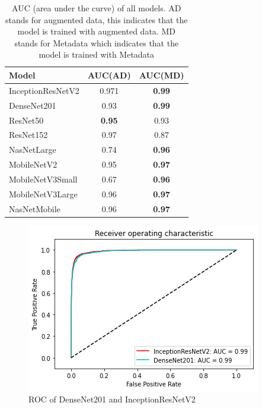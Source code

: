 \documentclass[sensors,article,submit,pdftex,moreauthors]{Definitions/mdpi}
\begin{document}
	\begin{table}[H]
		\centering
		\begin{tabular}{| l | c  c | }
			\hline
			Model & AUC(AD) & AUC(MD)\\ 
			\hline
			InceptionResNetV2 & 0.971 & \textbf{0.99}\\
			\hline
			DenseNet201 & 0.93 & \textbf{0.99}\\
			\hline
			ResNet50 & \textbf{0.95} & 0.93 \\
			\hline
			ResNet152 & 0.97 & 0.87\\
			\hline
			NasNetLarge & 0.74 & \textbf{0.96}\\
			\hline
			MobileNetV2 & 0.95 & \textbf{0.97}\\
			\hline
			MobileNetV3Small & 0.67 & \textbf{0.96}\\
			\hline
			MobileNetV3Large & 0.96 & \textbf{0.97}\\
			\hline
			NasNetMobile & 0.96 & \textbf{0.97}\\
			\hline
		\end{tabular}
		\caption{AUC (area under the curve) of all models. AD stands for augmented data, this indicates that the model is trained with augmented data. MD stands for Metadata which indicates that the model is trained with Metadata}
		\label{table:overall-auc}
	\end{table}
	
	\begin{figure}[!htb]
		\centering
		\includegraphics[width=1\linewidth]{Definitions/ROC/denvsirv2}
		\caption{ROC of DenseNet201 and InceptionResNetV2}\label{fig:densevsirv2}
	\end{figure}
	
\end{document}
